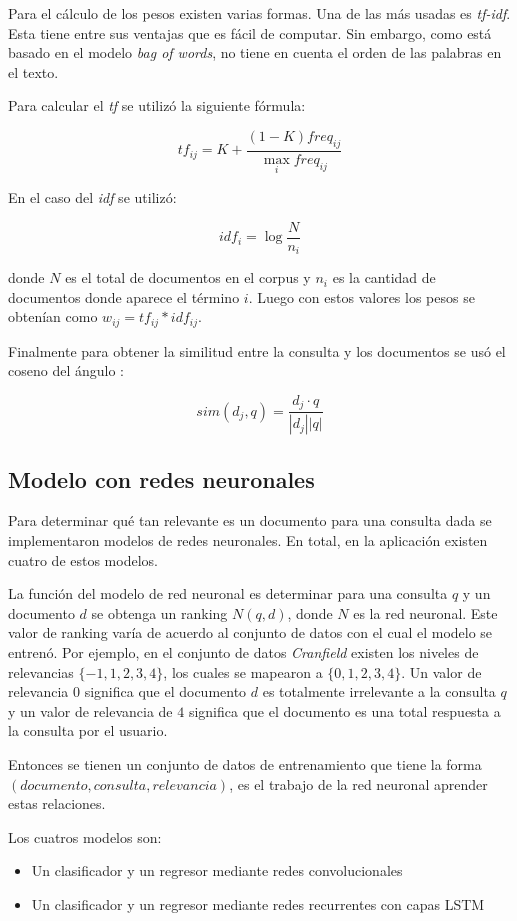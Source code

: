 \documentclass[12pt]{article}
\begin{document}
Para el cálculo de los pesos existen varias formas. Una de las más 
usadas es \textit{tf-idf}. Esta tiene entre sus ventajas que es 
fácil de computar. Sin embargo, como está basado en el modelo
\textit{bag of words}, no tiene en cuenta el orden de las palabras
en el texto.

Para calcular el \textit{tf} se utilizó la siguiente fórmula:

$$tf_{ij} = K + \frac{(1-K)freq_{ij}}{\max_{i} freq_{ij}}$$

En el caso del \textit{idf} se utilizó:

$$idf_i= \log \frac{N}{n_i}$$

donde $N$ es el total de documentos en el corpus y $n_i$ es la
cantidad de documentos donde aparece el término $i$. Luego con estos 
valores los pesos se obtenían como $w_{ij}= tf_{ij}*idf_{ij}$.

Finalmente para obtener la similitud entre la consulta y los 
documentos se usó el coseno del ángulo :

$$sim(d_{j},q) = \frac{ d_{j} \cdot q }{ |d_{j}||q| }$$


\subsection{Modelo con redes neuronales}

Para determinar qué tan relevante es un documento para una consulta dada se implementaron modelos de redes neuronales. En total, en la aplicación existen cuatro de estos modelos. 

La función del modelo de red neuronal es determinar para una consulta $q$ y un documento $d$ se obtenga un ranking $N(q,d)$, donde $N$ es la red neuronal. Este valor de ranking varía de acuerdo al conjunto de datos con el cual el modelo se entrenó. Por ejemplo, en el conjunto de datos \textit{Cranfield} existen los niveles de relevancias $\{-1,1,2,3,4\}$, los cuales se mapearon a $\{0,1,2,3,4\}$. Un valor de relevancia $0$ significa que el documento $d$ es totalmente irrelevante a la consulta $q$ y un valor de relevancia de $4$ significa que el documento es una total respuesta a la consulta por el usuario.

Entonces se tienen un conjunto de datos de entrenamiento que tiene la forma $(documento, consulta, relevancia)$, es el trabajo de la red neuronal aprender estas relaciones.

Los cuatros modelos son:
\begin{itemize}
	\item Un clasificador y un regresor mediante redes convolucionales
	\item Un clasificador y un regresor mediante redes recurrentes con capas LSTM
\end{itemize}
\end{document}
